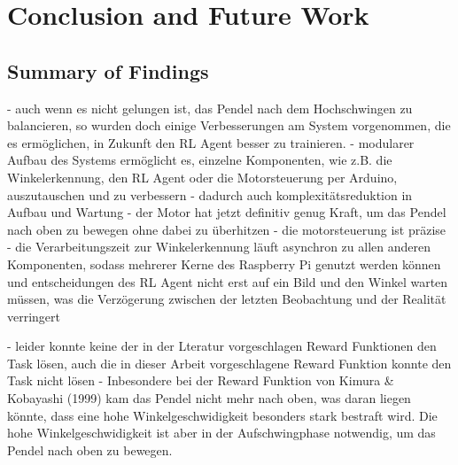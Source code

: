 \chapter{Conclusion and Future Work}

\section{Summary of Findings}
- auch wenn es nicht gelungen ist, das Pendel nach dem Hochschwingen zu balancieren, so wurden doch einige Verbesserungen am System vorgenommen, die es ermöglichen, in Zukunft den RL Agent besser zu trainieren.
- modularer Aufbau des Systems ermöglicht es, einzelne Komponenten, wie z.B. die Winkelerkennung, den RL Agent oder die Motorsteuerung per Arduino, auszutauschen und zu verbessern
- dadurch auch komplexitätsreduktion in Aufbau und Wartung
- der Motor hat jetzt definitiv genug Kraft, um das Pendel nach oben zu bewegen ohne dabei zu überhitzen
- die motorsteuerung ist präzise
- die Verarbeitungszeit zur Winkelerkennung läuft asynchron zu allen anderen Komponenten, sodass mehrerer Kerne des Raspberry Pi genutzt werden können und entscheidungen des RL Agent nicht erst auf ein Bild und den Winkel warten müssen, was die Verzögerung zwischen der letzten Beobachtung und der Realität verringert

- leider konnte keine der in der Lteratur vorgeschlagen Reward Funktionen den Task lösen, auch die in dieser Arbeit vorgeschlagene Reward Funktion konnte den Task nicht lösen
- Inbesondere bei der Reward Funktion von Kimura & Kobayashi (1999) kam das Pendel nicht mehr nach oben, was daran liegen könnte, dass eine hohe Winkelgeschwidigkeit besonders stark bestraft wird. Die hohe Winkelgeschwidigkeit ist aber in der Aufschwingphase notwendig, um das Pendel nach oben zu bewegen.

